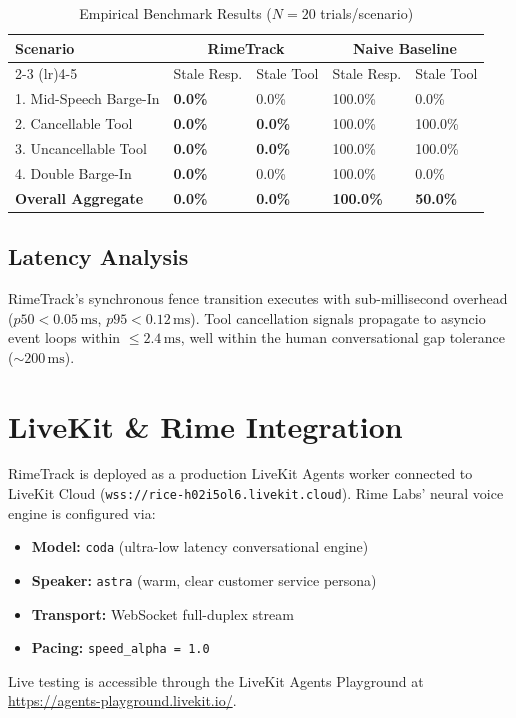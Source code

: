 \documentclass[10pt,journal,compsoc]{IEEEtran}
\theoremstyle{definition}
\begin{document}
\begin{table}[htbp]
\caption{Empirical Benchmark Results ($N=20$ trials/scenario)}
\label{tab:benchmark}
\centering
\begin{tabularx}{\columnwidth}{lXXXX}
\toprule
\textbf{Scenario} & \multicolumn{2}{c}{\textbf{RimeTrack}} & \multicolumn{2}{c}{\textbf{Naive Baseline}} \\
\cmidrule(lr){2-3} \cmidrule(lr){4-5}
& Stale Resp. & Stale Tool & Stale Resp. & Stale Tool \\
\midrule
1. Mid-Speech Barge-In & \textbf{0.0\%} & 0.0\% & 100.0\% & 0.0\% \\
2. Cancellable Tool    & \textbf{0.0\%} & \textbf{0.0\%} & 100.0\% & 100.0\% \\
3. Uncancellable Tool  & \textbf{0.0\%} & \textbf{0.0\%} & 100.0\% & 100.0\% \\
4. Double Barge-In     & \textbf{0.0\%} & 0.0\% & 100.0\% & 0.0\% \\
\midrule
\textbf{Overall Aggregate} & \textbf{0.0\%} & \textbf{0.0\%} & \textbf{100.0\%} & \textbf{50.0\%} \\
\bottomrule
\end{tabularx}
\end{table}

\subsection{Latency Analysis}
RimeTrack's synchronous fence transition executes with sub-millisecond overhead ($p50 < 0.05\,\text{ms}$, $p95 < 0.12\,\text{ms}$). Tool cancellation signals propagate to asyncio event loops within $\le 2.4\,\text{ms}$, well within the human conversational gap tolerance ($\sim 200\,\text{ms}$).

\section{LiveKit \& Rime Integration}
RimeTrack is deployed as a production LiveKit Agents worker connected to LiveKit Cloud (\texttt{wss://rice-h02i5ol6.livekit.cloud}). Rime Labs' neural voice engine is configured via:
\begin{itemize}
    \item \textbf{Model:} \texttt{coda} (ultra-low latency conversational engine)
    \item \textbf{Speaker:} \texttt{astra} (warm, clear customer service persona)
    \item \textbf{Transport:} WebSocket full-duplex stream
    \item \textbf{Pacing:} \texttt{speed\_alpha = 1.0}
\end{itemize}
Live testing is accessible through the LiveKit Agents Playground at \url{https://agents-playground.livekit.io/}.
\end{document}
